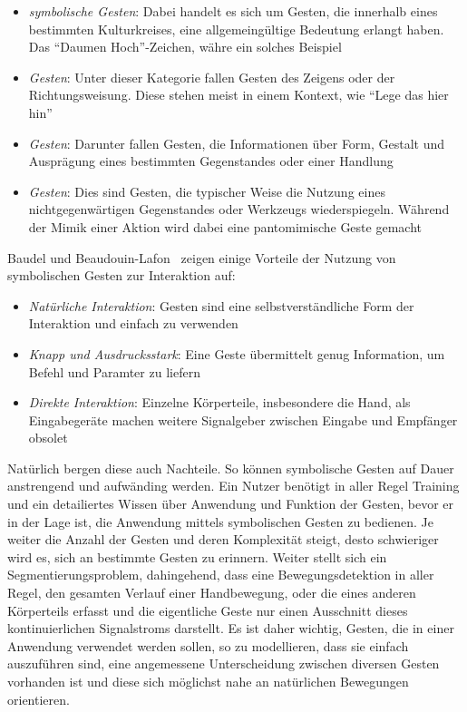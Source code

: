 \begin{itemize}
\item \textit{symbolische Gesten}: Dabei handelt es sich um Gesten, die innerhalb eines bestimmten Kulturkreises, eine allgemeing\"ultige Bedeutung erlangt haben. Das \enquote{Daumen Hoch}-Zeichen, w\"ahre ein solches Beispiel
\item \textit{ Gesten}: Unter dieser Kategorie fallen Gesten des Zeigens oder der Richtungsweisung. Diese stehen meist in einem Kontext, wie \enquote{Lege das hier hin}
\item \textit{ Gesten}: Darunter fallen Gesten, die Informationen \"uber Form, Gestalt und Auspr\"agung eines bestimmten Gegenstandes oder einer Handlung
\item \textit{ Gesten}: Dies sind Gesten, die typischer Weise die Nutzung eines nichtgegenw\"artigen Gegenstandes oder Werkzeugs wiederspiegeln. W\"ahrend der Mimik einer Aktion wird dabei eine pantomimische Geste gemacht
\end{itemize}
Baudel und Beaudouin-Lafon~\cite{bib:baudel} zeigen einige Vorteile der Nutzung von symbolischen Gesten zur Interaktion auf:
\begin{itemize}
\item \textit{Nat\"urliche Interaktion}: Gesten sind eine selbstverst\"andliche Form der Interaktion und einfach zu verwenden
\item \textit{Knapp und Ausdrucksstark}: Eine Geste \"ubermittelt genug Information, um Befehl und Paramter zu liefern
\item \textit{Direkte Interaktion}: Einzelne K\"orperteile, insbesondere die Hand, als Eingabeger\"ate machen weitere Signalgeber zwischen Eingabe und Empf\"anger obsolet
\end{itemize}
Nat\"urlich bergen diese auch Nachteile. So k\"onnen symbolische Gesten auf Dauer anstrengend und aufw\"anding werden. Ein Nutzer ben\"otigt in aller Regel Training und ein detailiertes Wissen \"uber Anwendung und Funktion der Gesten, bevor er in der Lage ist, die Anwendung mittels symbolischen Gesten zu bedienen. Je weiter die Anzahl der Gesten und deren Komplexit\"at steigt, desto schwieriger wird es, sich an bestimmte Gesten zu erinnern.
\newline
Weiter stellt sich ein Segmentierungsproblem, dahingehend, dass eine Bewegungsdetektion in aller Regel, den gesamten Verlauf einer Handbewegung, oder die eines anderen K\"orperteils erfasst und die eigentliche Geste nur einen Ausschnitt dieses kontinuierlichen Signalstroms darstellt.
\newline
Es ist daher wichtig, Gesten, die in einer Anwendung verwendet werden sollen, so zu modellieren, dass sie einfach auszuf\"uhren sind, eine angemessene Unterscheidung zwischen diversen Gesten vorhanden ist und diese sich m\"oglichst nahe an nat\"urlichen Bewegungen orientieren.

